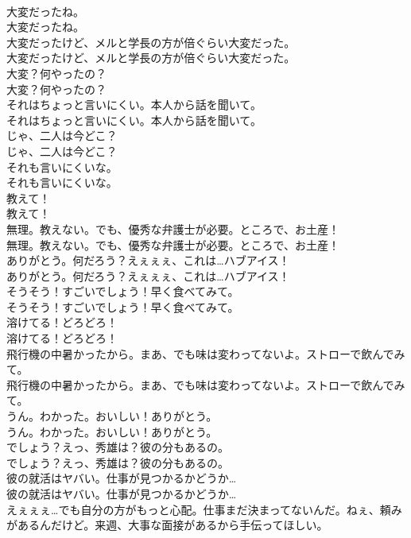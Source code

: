 \documentclass[8pt]{extreport}
\begin{document}
\begin{CJK}{UTF8}{min}
\\	大変だったね。	
\\	大変だったね。 
\\	大変だったけど、メルと学長の方が倍ぐらい大変だった。	
\\	大変だったけど、メルと学長の方が倍ぐらい大変だった。 
\\	大変？何やったの？	
\\	大変？何やったの？ 
\\	それはちょっと言いにくい。本人から話を聞いて。	
\\	それはちょっと言いにくい。本人から話を聞いて。 
\\	じゃ、二人は今どこ？	
\\	じゃ、二人は今どこ？ 
\\	それも言いにくいな。	
\\	それも言いにくいな。 
\\	教えて！	
\\	教えて！ 
\\	無理。教えない。でも、優秀な弁護士が必要。ところで、お土産！	
\\	無理。教えない。でも、優秀な弁護士が必要。ところで、お土産！ 
\\	ありがとう。何だろう？えぇぇぇ、これは…ハブアイス！	
\\	ありがとう。何だろう？えぇぇぇ、これは…ハブアイス！ 
\\	そうそう！すごいでしょう！早く食べてみて。	
\\	そうそう！すごいでしょう！早く食べてみて。 
\\	溶けてる！どろどろ！	
\\	溶けてる！どろどろ！ 
\\	飛行機の中暑かったから。まあ、でも味は変わってないよ。ストローで飲んでみて。	
\\	飛行機の中暑かったから。まあ、でも味は変わってないよ。ストローで飲んでみて。 
\\	うん。わかった。おいしい！ありがとう。	
\\	うん。わかった。おいしい！ありがとう。 
\\	でしょう？えっ、秀雄は？彼の分もあるの。	
\\	でしょう？えっ、秀雄は？彼の分もあるの。 
\\	彼の就活はヤバい。仕事が見つかるかどうか…	
\\	彼の就活はヤバい。仕事が見つかるかどうか… 
\\	えぇぇぇ…でも自分の方がもっと心配。仕事まだ決まってないんだ。ねぇ、頼みがあるんだけど。来週、大事な面接があるから手伝ってほしい。	

\end{CJK}
\end{document}
